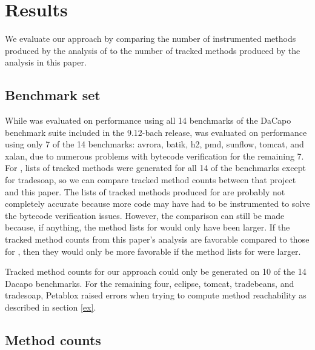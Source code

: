 \chapter{Results}
We evaluate our approach by comparing the number of instrumented
methods produced by the analysis of \phosphorpi{} to the number of
tracked methods produced by the analysis in this paper.

\section{Benchmark set}
While \phosphor{} was evaluated on performance using all 14 benchmarks
of the DaCapo benchmark suite \cite{dacapobach} included in the
9.12-bach release, \phosphorpi{} was evaluated on performance using
only 7 of the 14 benchmarks: avrora, batik, h2, pmd, sunflow, tomcat,
and xalan, due to numerous problems with bytecode verification for the
remaining 7. For \phosphorpi{}, lists of tracked methods were
generated for all 14 of the benchmarks except for tradesoap, so we can
compare tracked method counts between that project and this paper. The
lists of tracked methods produced for \phosphorpi{} are probably not
completely accurate because more code may have had to be instrumented
to solve the bytecode verification issues. However, the comparison can
still be made because, if anything, the method lists for \phosphorpi{}
would only have been larger. If the tracked method counts from this
paper's analysis are favorable compared to those for \phosphorpi{},
then they would only be more favorable if the method lists for
\phosphorpi{} were larger.

Tracked method counts for our approach could only be generated on 10
of the 14 Dacapo benchmarks. For the remaining four, eclipse, tomcat,
tradebeans, and tradesoap, Petablox raised errors when trying to
compute method reachability as described in section \ref{ex}.

\section{Method counts}

